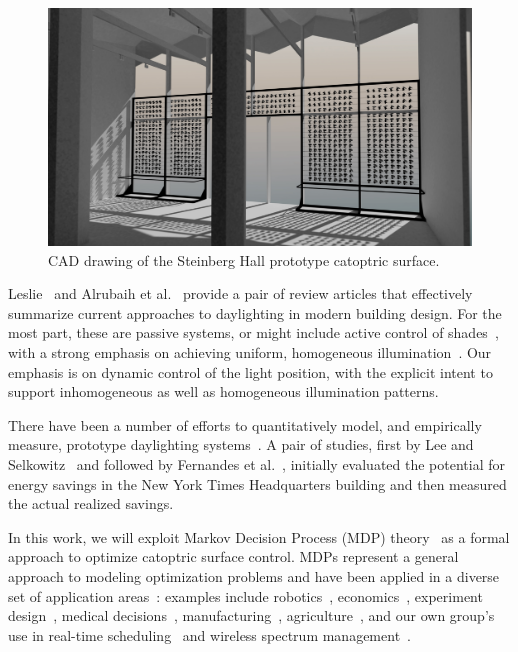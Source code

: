 \begin{figure}[ht]
\centering
\includegraphics[width=0.8\linewidth]{figures/steinberg2}
\caption{CAD drawing of the Steinberg Hall prototype catoptric surface.}
\label{fig:steinberg2}
\end{figure}

Leslie~\cite{Leslie03} and Alrubaih et al.~\cite{azaise13} provide
a pair of review articles that effectively summarize current
approaches to daylighting in modern building design.
For the most part, these are passive systems, or might include
active control of shades~\cite{kt16}, with a strong emphasis on
achieving uniform, homogeneous illumination~\cite{bwkk15,gb16}.
Our emphasis is on dynamic control of the light position, with the explicit
intent to support inhomogeneous as well as homogeneous illumination patterns.

There have been a number of efforts to quantitatively model, and
empirically measure, prototype daylighting
systems~\cite{bwkk15,fsdm14,ls06,vm16,vgf+13}. A pair of studies, first by
Lee and Selkowitz~\cite{ls06} and followed by Fernandes et al.~\cite{fsdm14},
initially evaluated the potential for energy savings in the New York Times
Headquarters building and then measured the actual realized savings.

In this work, we will exploit Markov Decision Process (MDP)
theory~\cite{puterman} as a formal approach to optimize
catoptric surface control. MDPs represent a general approach
to modeling optimization problems and have been applied in a diverse set of
application areas~\cite{White93}: examples include robotics~\cite{ab10}, 
economics~\cite{bs98}, experiment design~\cite{kb85},
medical decisions~\cite{ahsr10}, manufacturing~\cite{yyl04},
agriculture~\cite{Kristensen03},
and our own group's use in real-time scheduling~\cite{gtsg08,tggs10}
and wireless spectrum management~\cite{mgc16}.

